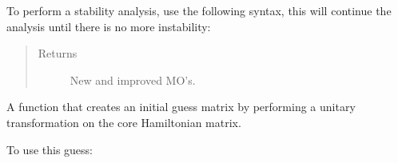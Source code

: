 \documentclass[letterpaper,10pt,english]{sphinxmanual}
\begin{document}
\begin{fulllineitems}
\begin{fulllineitems}
To perform a stability analysis, use the following syntax, this will continue the analysis until there is
no more instability:

\begin{sphinxVerbatim}[commandchars=\\\{\}]
           
   
  
 
      
    
\end{sphinxVerbatim}
\begin{quote}\begin{description}
\item[{Returns}] \leavevmode
New and improved MO’s.

\end{description}\end{quote}

\end{fulllineitems}


\begin{fulllineitems}
\label{\detokenize{Real_GHF:ghf.real_GHF.RealGHF.unitary_rotation_guess}}
A function that creates an initial guess matrix by performing a unitary transformation on the core Hamiltonian
matrix.

To use this guess:


\end{fulllineitems}
\end{fulllineitems}
\end{document}
